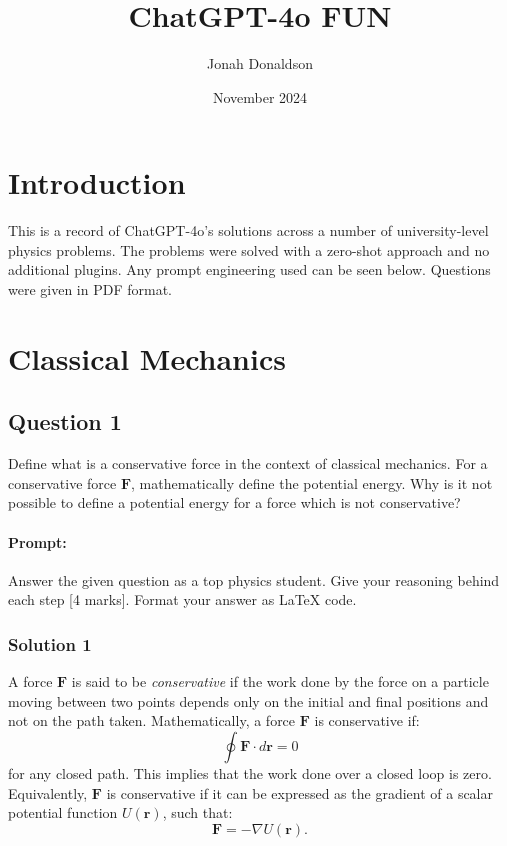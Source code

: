 \documentclass{article}
\title{ChatGPT-4o FUN}
\author{Jonah Donaldson}
\date{November 2024}
\begin{document}
\maketitle

\tableofcontents
\newpage

\section{Introduction}

This is a record of ChatGPT-4o's solutions across a number of university-level physics problems. The problems were solved with a zero-shot approach and no additional plugins. Any prompt engineering used can be seen below. Questions were given in PDF format.

\section{Classical Mechanics}

\subsection{Question 1}
Define what is a conservative force in the context of classical mechanics. For a conservative force $\mathbf{F}$, mathematically define the potential energy. Why is it not possible to define a potential energy for a force which is not conservative?

\paragraph{Prompt: \\} 
Answer the given question as a top physics student. Give your reasoning behind each step [4 marks].
Format your answer as LaTeX code.

\subsubsection{Solution 1}
A force $\mathbf{F}$ is said to be \textit{conservative} if the work done by the force on a particle moving between two points depends only on the initial and final positions and not on the path taken. Mathematically, a force $\mathbf{F}$ is conservative if:
\[
\oint \mathbf{F} \cdot d\mathbf{r} = 0
\]
for any closed path. This implies that the work done over a closed loop is zero. Equivalently, $\mathbf{F}$ is conservative if it can be expressed as the gradient of a scalar potential function $U(\mathbf{r})$, such that:
\[
\mathbf{F} = -\nabla U(\mathbf{r}).
\]
\end{document}
